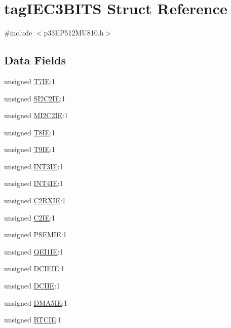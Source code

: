 \hypertarget{structtag_i_e_c3_b_i_t_s}{}\section{tag\+I\+E\+C3\+B\+I\+TS Struct Reference}
\label{structtag_i_e_c3_b_i_t_s}


{\ttfamily \#include $<$p33\+E\+P512\+M\+U810.\+h$>$}

\subsection*{Data Fields}
\begin{DoxyCompactItemize}
\item 
unsigned \hyperlink{structtag_i_e_c3_b_i_t_s_ac93af6119b654e526bca0dc07266bf0a}{T7\+IE}\+:1
\item 
unsigned \hyperlink{structtag_i_e_c3_b_i_t_s_af8fc50ba2387bd3578c3ff1d4d132e22}{S\+I2\+C2\+IE}\+:1
\item 
unsigned \hyperlink{structtag_i_e_c3_b_i_t_s_a401f48aefb2eb153016799fa277a7582}{M\+I2\+C2\+IE}\+:1
\item 
unsigned \hyperlink{structtag_i_e_c3_b_i_t_s_afc6ab4571f13bf4f8dc4ba3a8f24825a}{T8\+IE}\+:1
\item 
unsigned \hyperlink{structtag_i_e_c3_b_i_t_s_ad64cadaad4d3854fe6b070ae3ad46be0}{T9\+IE}\+:1
\item 
unsigned \hyperlink{structtag_i_e_c3_b_i_t_s_ad2c20c03c8a6d6b0ebdcef32908b4b93}{I\+N\+T3\+IE}\+:1
\item 
unsigned \hyperlink{structtag_i_e_c3_b_i_t_s_af14d590d74e4a6ddcd04544675a52a3b}{I\+N\+T4\+IE}\+:1
\item 
unsigned \hyperlink{structtag_i_e_c3_b_i_t_s_a5014e2e9441f7514e157635095c6318d}{C2\+R\+X\+IE}\+:1
\item 
unsigned \hyperlink{structtag_i_e_c3_b_i_t_s_a4c66dbab053bf3730918106e3c7688f8}{C2\+IE}\+:1
\item 
unsigned \hyperlink{structtag_i_e_c3_b_i_t_s_a8234558695d01d664e44b89962c16501}{P\+S\+E\+M\+IE}\+:1
\item 
unsigned \hyperlink{structtag_i_e_c3_b_i_t_s_a738ed0102d6acd3cd77a2d30b1be54eb}{Q\+E\+I1\+IE}\+:1
\item 
unsigned \hyperlink{structtag_i_e_c3_b_i_t_s_a53c3337e3e7ce4fc95cbf9937c1760f2}{D\+C\+I\+E\+IE}\+:1
\item 
unsigned \hyperlink{structtag_i_e_c3_b_i_t_s_ab7346e1330d2ed85cdf66d74a54b0424}{D\+C\+I\+IE}\+:1
\item 
unsigned \hyperlink{structtag_i_e_c3_b_i_t_s_ac4776351918ad587f26073330a43ea3d}{D\+M\+A5\+IE}\+:1
\item 
unsigned \hyperlink{structtag_i_e_c3_b_i_t_s_ab7189dfe0143925634fc858475a1ef6c}{R\+T\+C\+IE}\+:1
\end{DoxyCompactItemize}


